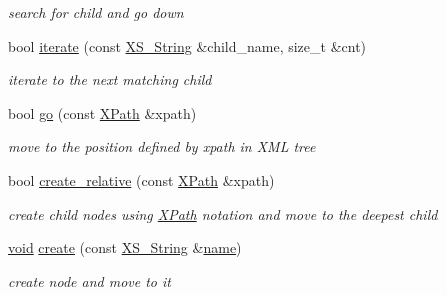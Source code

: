 \begin{DoxyCompactItemize}
\begin{DoxyCompactList}\small\item\em search for child and go down \end{DoxyCompactList}\item 
\mbox{\label{struct_x_m_l_storage_1_1_x_m_l_pos_a967182fa8c8f01bc3f0559cd17b4ace4}} 
bool \hyperlink{struct_x_m_l_storage_1_1_x_m_l_pos_a967182fa8c8f01bc3f0559cd17b4ace4}{iterate} (const \hyperlink{struct_x_m_l_storage_1_1_x_s___string}{X\+S\+\_\+\+String} \&child\+\_\+name, size\+\_\+t \&cnt)
\begin{DoxyCompactList}\small\item\em iterate to the next matching child \end{DoxyCompactList}\item 
\mbox{\label{struct_x_m_l_storage_1_1_x_m_l_pos_a574be3978e67558f5614a820d71dd3b3}} 
bool \hyperlink{struct_x_m_l_storage_1_1_x_m_l_pos_a574be3978e67558f5614a820d71dd3b3}{go} (const \hyperlink{struct_x_m_l_storage_1_1_x_path}{X\+Path} \&xpath)
\begin{DoxyCompactList}\small\item\em move to the position defined by xpath in X\+ML tree \end{DoxyCompactList}\item 
\mbox{\label{struct_x_m_l_storage_1_1_x_m_l_pos_aa63699caa1513515c4b54aa578d9c0ac}} 
bool \hyperlink{struct_x_m_l_storage_1_1_x_m_l_pos_aa63699caa1513515c4b54aa578d9c0ac}{create\+\_\+relative} (const \hyperlink{struct_x_m_l_storage_1_1_x_path}{X\+Path} \&xpath)
\begin{DoxyCompactList}\small\item\em create child nodes using \hyperlink{struct_x_m_l_storage_1_1_x_path}{X\+Path} notation and move to the deepest child \end{DoxyCompactList}\item 
\mbox{\label{struct_x_m_l_storage_1_1_x_m_l_pos_a9fb49c24a3bd7ff3b814c2f1f398fa0a}} 
\hyperlink{interfacevoid}{void} \hyperlink{struct_x_m_l_storage_1_1_x_m_l_pos_a9fb49c24a3bd7ff3b814c2f1f398fa0a}{create} (const \hyperlink{struct_x_m_l_storage_1_1_x_s___string}{X\+S\+\_\+\+String} \&\hyperlink{structname}{name})
\begin{DoxyCompactList}\small\item\em create node and move to it \end{DoxyCompactList}\item 

\end{DoxyCompactItemize}
